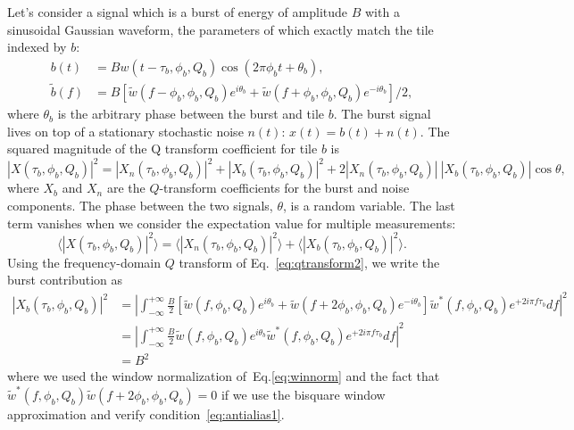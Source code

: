 Let's consider a signal which is a burst of energy of amplitude $B$ with a sinusoidal Gaussian waveform, the parameters of which exactly match the tile indexed by $b$:
\begin{align}
  b(t) &= Bw(t-\tau_b, \phi_b, Q_b)\cos(2\pi\phi_b t + \theta_b),\\
  \tilde{b}(f) &= B\left[ \tilde{w}(f-\phi_b,\phi_b,Q_b)e^{i\theta_b}+\tilde{w}(f+\phi_b,\phi_b,Q_b)e^{-i\theta_b}\right]/2,
\end{align}
where $\theta_b$ is the arbitrary phase between the burst and tile $b$. The burst signal lives on top of a stationary stochastic noise $n(t)$: $x(t) = b(t) + n(t)$. The squared magnitude of the Q transform coefficient for tile $b$ is
\begin{equation}
  |X(\tau_b, \phi_b, Q_b)|^2 = |X_n(\tau_b, \phi_b, Q_b)|^2 + |X_b(\tau_b, \phi_b, Q_b)|^2 + 2|X_n(\tau_b, \phi_b, Q_b)|\ |X_b(\tau_b, \phi_b, Q_b)|\cos{\theta},
\end{equation}
where $X_b$ and $X_n$ are the $Q$-transform coefficients for the burst and noise components. The phase between the two signals, $\theta$, is a random variable. The last term vanishes when we consider the expectation value for multiple measurements:
\begin{equation}
  \langle |X(\tau_b, \phi_b, Q_b)|^2 \rangle= \langle |X_n(\tau_b, \phi_b, Q_b)|^2 \rangle + \langle |X_b(\tau_b, \phi_b, Q_b)|^2 \rangle.
\end{equation}
Using the frequency-domain $Q$ transform of Eq.~\ref{eq:qtransform2}, we write the burst contribution as
\begin{align}
  |X_b(\tau_b, \phi_b, Q_b)|^2 &= \left|\int_{-\infty}^{+\infty}{ \frac{B}{2}\left[ \tilde{w}(f,\phi_b,Q_b)e^{i\theta_b}+\tilde{w}(f+2\phi_b,\phi_b,Q_b)e^{-i\theta_b}\right] \tilde{w}^{*}(f,\phi_b,Q_b) e^{+2i\pi f \tau_b}df} \right|^2\\
  &= \left|\int_{-\infty}^{+\infty}{ \frac{B}{2} \tilde{w}(f,\phi_b,Q_b)e^{i\theta_b} \tilde{w}^{*}(f,\phi_b,Q_b) e^{+2i\pi f \tau_b}df}\right|^2 \\
  &= B^2
  \label{eq:qtransform_signal}
\end{align}
where we used the window normalization of~Eq.\ref{eq:winnorm} and the fact that $\tilde{w}^{*}(f,\phi_b,Q_b)\tilde{w}(f+2\phi_b,\phi_b,Q_b)=0$ if we use the bisquare window approximation and verify condition~\ref{eq:antialias1}.

